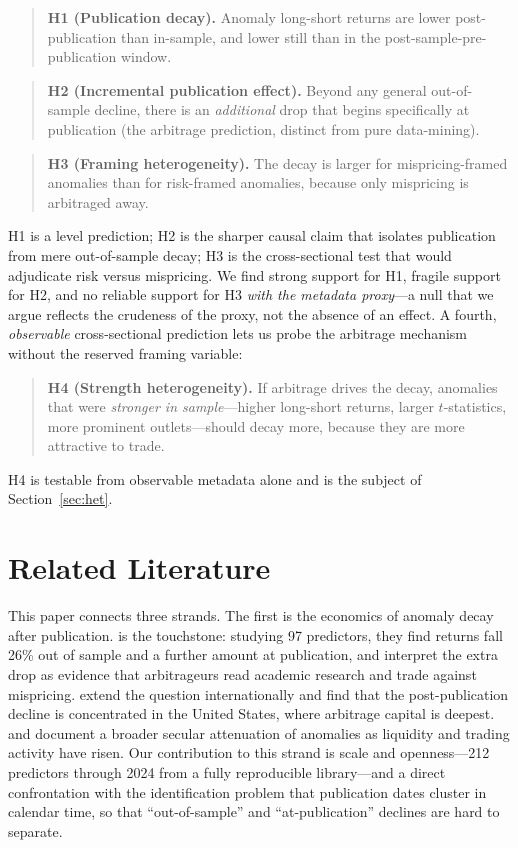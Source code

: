\documentclass[12pt]{article}
\begin{document}
\begin{quote}
\textbf{H1 (Publication decay).} Anomaly long-short returns are lower post-publication than
in-sample, and lower still than in the post-sample-pre-publication window.
\end{quote}
\begin{quote}
\textbf{H2 (Incremental publication effect).} Beyond any general out-of-sample decline, there
is an \emph{additional} drop that begins specifically at publication (the arbitrage
prediction, distinct from pure data-mining).
\end{quote}
\begin{quote}
\textbf{H3 (Framing heterogeneity).} The decay is larger for mispricing-framed anomalies than
for risk-framed anomalies, because only mispricing is arbitraged away.
\end{quote}
H1 is a level prediction; H2 is the sharper causal claim that isolates publication from mere
out-of-sample decay; H3 is the cross-sectional test that would adjudicate risk versus
mispricing. We find strong support for H1, fragile support for H2, and no reliable support for
H3 \emph{with the metadata proxy}---a null that we argue reflects the crudeness of the proxy,
not the absence of an effect. A fourth, \emph{observable} cross-sectional prediction lets us
probe the arbitrage mechanism without the reserved framing variable:
\begin{quote}
\textbf{H4 (Strength heterogeneity).} If arbitrage drives the decay, anomalies that were
\emph{stronger in sample}---higher long-short returns, larger $t$-statistics, more prominent
outlets---should decay more, because they are more attractive to trade.
\end{quote}
H4 is testable from observable metadata alone and is the subject of Section~\ref{sec:het}.

\section{Related Literature}\label{sec:lit}
This paper connects three strands. The first is the economics of anomaly decay after
publication. \citet{mcleanpontiff2016} is the touchstone: studying 97 predictors, they find
returns fall 26\% out of sample and a further amount at publication, and interpret the extra
drop as evidence that arbitrageurs read academic research and trade against mispricing.
\citet{jacobsmuller2020} extend the question internationally and find that the post-publication
decline is concentrated in the United States, where arbitrage capital is deepest.
\citet{chordia2014} and \citet{greenhandzhang2017} document a broader secular attenuation of
anomalies as liquidity and trading activity have risen. Our contribution to this strand is
scale and openness---212 predictors through 2024 from a fully reproducible library---and a
direct confrontation with the identification problem that publication dates cluster in calendar
time, so that ``out-of-sample'' and ``at-publication'' declines are hard to separate.
\end{document}
